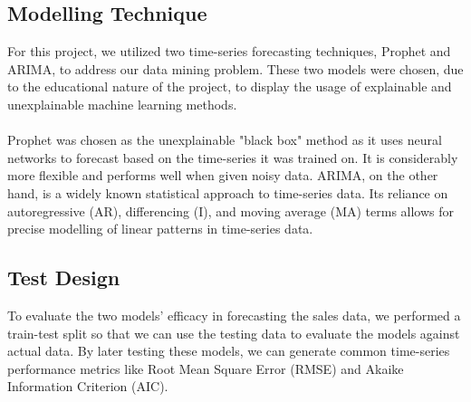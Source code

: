 \documentclass{article}
\begin{document}
    \subsection{Modelling Technique}
        For this project, we utilized two time-series forecasting techniques, Prophet and ARIMA,
        to address our data mining problem. These two models were chosen, due to the educational
        nature of the project, to display the usage of explainable and unexplainable machine
        learning methods. \\
        \\
        Prophet was chosen as the unexplainable "black box" method as it uses neural networks to
        forecast based on the time-series it was trained on. It is considerably more flexible
        and performs well when given noisy data. ARIMA, on the other hand, is a widely known
        statistical approach to time-series data. Its reliance on autoregressive (AR), differencing
        (I), and moving average (MA) terms allows for precise modelling of linear patterns 
        in time-series data.
    \subsection{Test Design}
        To evaluate the two models' efficacy in forecasting the sales data, we performed a train-test
        split so that we can use the testing data to evaluate the models against actual data. By
        later testing these models, we can generate common time-series performance metrics like Root
        Mean Square Error (RMSE) and Akaike Information Criterion (AIC).
\end{document}

